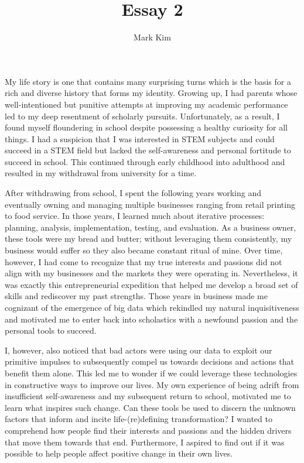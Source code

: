 \documentclass[12pt]{article}
\title{Essay 2}
\author{Mark Kim}
\begin{document}
\maketitle

My life story is one that contains many surprising turns which is the basis for
a rich and diverse history that forms my identity.  Growing up, I had parents
whose well-intentioned but punitive attempts at improving my academic
performance led to my deep resentment of scholarly pursuits.  Unfortunately, as
a result, I found myself floundering in school despite possessing a healthy
curiosity for all things.  I had a suspicion that I was interested in STEM
subjects and could succeed in a STEM field but lacked the self-awareness and
personal fortitude to succeed in school.  This continued through early childhood
into adulthood and resulted in my withdrawal from university for a time.

After withdrawing from school, I spent the following years working and
eventually owning and managing multiple businesses ranging from retail printing
to food service.  In those years, I learned much about iterative processes:
planning, analysis, implementation, testing, and evaluation.  As a business
owner, these tools were my bread and butter; without leveraging them
consistently, my business would suffer so they also became constant ritual of mine.
Over time, however, I had come to recognize that my true interests and
passions did not align with my businesses and the markets they were operating
in. Nevertheless, it was exactly this entrepreneurial expedition that helped me
develop a broad set of skills and rediscover my past strengths.  Those years in
business made me cognizant of the emergence of big data which rekindled my natural
inquisitiveness and motivated me to enter back into scholastics with a newfound
passion and the personal tools to succeed.

I, however, also noticed that bad actors were using our data to exploit our primitive
impulses to subsequently compel us towards decisions and actions that benefit
them alone.  This led me to wonder if we could leverage these technologies in
constructive ways to improve our lives.  My own experience of being adrift from
insufficient self-awareness and my subsequent return to school, motivated me to
learn what inspires such change.  Can these tools be used to discern the unknown
factors that inform and incite life-(re)defining transformation?  I wanted to
comprehend how people find their interests and passions and the hidden drivers
that move them towards that end.  Furthermore, I aspired to find out if it was
possible to help people affect positive change in their own lives.
\end{document}
